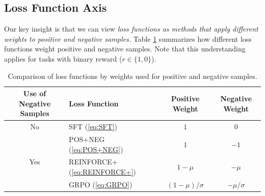 \documentclass{article}
\newcommand{\todo}[1]{\textcolor{red}{TODO: #1}}
\begin{document}


\subsection{Loss Function Axis}
Our key insight is that we can view \emph{loss functions as methods that apply different weights to positive and negative samples.} Table \ref{tab:loss_function_comparison} summarizes how different loss functions weight positive and negative samples. Note that this understanding applies for tasks with binary reward ($r \in \{1, 0\}$).

\begin{table}[h!]
\centering
\begin{tabular}{clcc}
\toprule
\textbf{Use of Negative Samples} & \textbf{Loss Function} & \textbf{Positive Weight} & \textbf{Negative Weight} \\
\midrule
No & SFT (\ref{eq:SFT}) & $1$ & $0$ \\
\midrule 
\multirow{3}{*}{Yes} & POS+NEG (\ref{eq:POS+NEG}) & $1$ & $-1$ \\
& REINFORCE+ (\ref{eq:REINFORCE+}) & $1 - \mu$ & $- \mu$ \\
& GRPO (\ref{eq:GRPO}) & $(1 - \mu)/\sigma$ & $-\mu/\sigma$ \\
\bottomrule
\end{tabular}
\label{tab:loss_function_comparison}
\vspace{0.5em}
\caption{Comparison of loss functions by weights used for positive and negative samples.}
\end{table}
\end{document}
